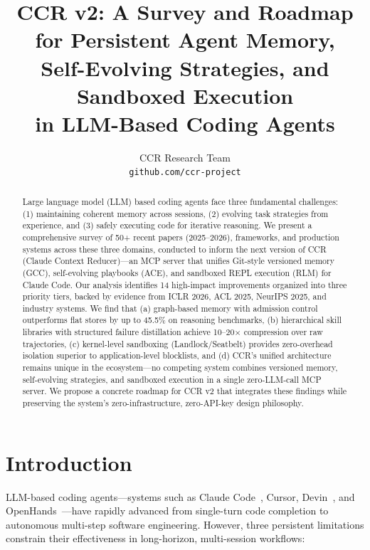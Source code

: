 \documentclass[11pt]{article}
\title{CCR v2: A Survey and Roadmap for Persistent Agent Memory,\\Self-Evolving Strategies, and Sandboxed Execution\\in LLM-Based Coding Agents}
\author{
  CCR Research Team \\
  \texttt{github.com/ccr-project}
}
\begin{document}
\maketitle

\begin{abstract}
Large language model (LLM) based coding agents face three fundamental challenges: (1) maintaining coherent memory across sessions, (2) evolving task strategies from experience, and (3) safely executing code for iterative reasoning. We present a comprehensive survey of 50+ recent papers (2025--2026), frameworks, and production systems across these three domains, conducted to inform the next version of CCR (Claude Context Reducer)---an MCP server that unifies Git-style versioned memory (GCC), self-evolving playbooks (ACE), and sandboxed REPL execution (RLM) for Claude Code. Our analysis identifies 14 high-impact improvements organized into three priority tiers, backed by evidence from ICLR 2026, ACL 2025, NeurIPS 2025, and industry systems. We find that (a) graph-based memory with admission control outperforms flat stores by up to 45.5\% on reasoning benchmarks, (b) hierarchical skill libraries with structured failure distillation achieve 10--20$\times$ compression over raw trajectories, (c) kernel-level sandboxing (Landlock/Seatbelt) provides zero-overhead isolation superior to application-level blocklists, and (d) CCR's unified architecture remains unique in the ecosystem---no competing system combines versioned memory, self-evolving strategies, and sandboxed execution in a single zero-LLM-call MCP server. We propose a concrete roadmap for CCR v2 that integrates these findings while preserving the system's zero-infrastructure, zero-API-key design philosophy.
\end{abstract}

\section{Introduction}
\label{sec:intro}

LLM-based coding agents---systems such as Claude Code~\cite{anthropic_ce}, Cursor, Devin~\cite{devin}, and OpenHands~\cite{openhands}---have rapidly advanced from single-turn code completion to autonomous multi-step software engineering. However, three persistent limitations constrain their effectiveness in long-horizon, multi-session workflows:
\end{document}

